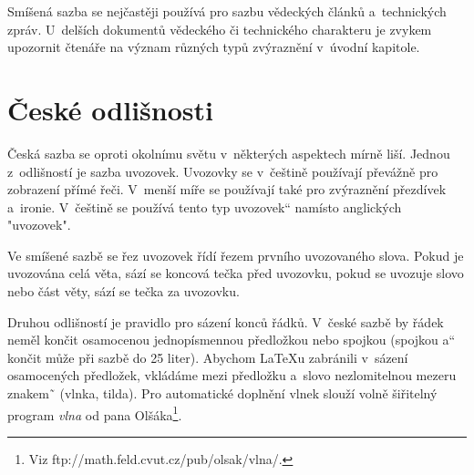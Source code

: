 \documentclass[11pt,a4paper,twocolumn]{article}
\newcommand{\myuv}[1]{\quotedblbase #1\textquotedblleft}
\begin{document}
Smíšená sazba se nejčastěji používá pro sazbu vě\-deckých článků a~technických zpráv. U~delších doku\-mentů vědeckého či technického charakteru je zvykem upozornit čtenáře na význam různých typů zvýrazně\-ní v~úvodní kapitole.

\section{České odlišnosti}

Česká sazba se oproti okolnímu světu v~některých aspektech mírně liší. Jednou z~odlišností je sazba uvo\-zovek. Uvozovky se v~češtině používají převážně pro zobrazení přímé řeči. V~menší míře se používají také pro zvýraznění přezdívek a~ironie. V~češtině se použí\-vá tento \myuv{typ uvozovek} namísto anglických "uvozo\-vek".

Ve smíšené sazbě se řez uvozovek řídí řezem první\-ho uvozovaného slova. Pokud je uvozována celá věta, sází se koncová tečka před uvozovku, pokud se uvozuje slovo nebo část věty, sází se tečka za uvozovku.

Druhou odlišností je pravidlo pro sázení konců řádků. V~české sazbě by řádek neměl končit osamocenou jednopísmennou předložkou nebo spojkou (spojkou \myuv{a} končit může při sazbě do 25 liter). Abychom \LaTeX u zabránili v~sázení osamocených předložek, vkládáme mezi předložku a~slovo nezlomitelnou me\-zeru znakem \~\, (vlnka, tilda). Pro automatické do\-plnění vlnek slouží volně šiřitelný program \textit{vlna} od pana Olšáka\footnote{Viz ftp://math.feld.cvut.cz/pub/olsak/vlna/.}.
\end{document}

